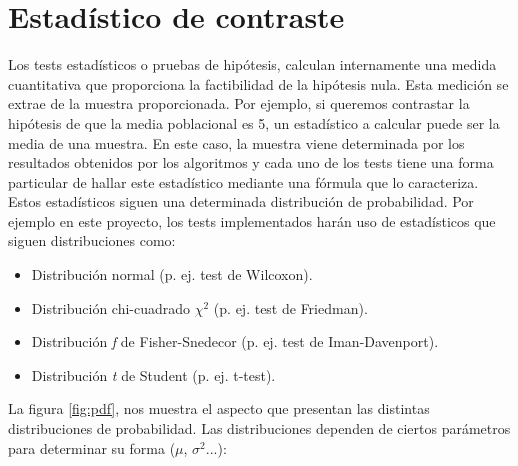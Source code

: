 \section{Estadístico de contraste} \label{estadistico}
Los tests estadísticos o pruebas de hipótesis, calculan internamente una medida cuantitativa que proporciona la
factibilidad de la hipótesis nula. Esta medición se extrae de la muestra proporcionada. Por ejemplo, si queremos
contrastar la hipótesis de que la media poblacional es 5, un estadístico a calcular puede ser la media de una
muestra. En este caso, la muestra viene determinada por los resultados obtenidos por los algoritmos y cada uno de
los tests tiene una forma particular de hallar este estadístico mediante una fórmula que lo caracteriza. Estos
estadísticos siguen una determinada distribución de probabilidad. Por ejemplo en este proyecto, los tests
implementados harán uso de estadísticos que siguen distribuciones como:
\begin{itemize}
\item Distribución normal (p. ej. test de Wilcoxon).
\item Distribución chi-cuadrado $\chi^2$ (p. ej. test de Friedman).
\item Distribución \textit{f} de Fisher-Snedecor (p. ej. test de Iman-Davenport).
\item Distribución \textit{t} de Student (p. ej. t-test).
\end{itemize}
La figura \ref{fig:pdf}, nos muestra el aspecto que presentan las distintas distribuciones de probabilidad. Las
distribuciones dependen de ciertos parámetros para determinar su forma ($\mu$, $\sigma^2$...): 
\begin{figure}[h]
\centering
{}
\end{figure}
